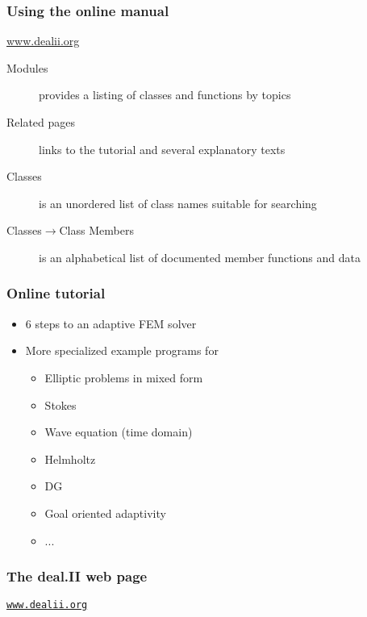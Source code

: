 \begin{frame}
  \frametitle{Using the online manual}
  \begin{center}
    \url{www.dealii.org}
  \end{center}
  \begin{description}
  \item[Modules] provides a listing of
    classes and functions by topics
  \item[Related pages] links to the tutorial and several explanatory
    texts
  \item[Classes] is an unordered list of class names suitable for
    searching
  \item[Classes$\rightarrow$Class Members] is an alphabetical list of
    documented member functions and data
  \end{description}
\end{frame}

\begin{frame}
  \frametitle{Online tutorial}
  \begin{itemize}
  \item 6 steps to an adaptive FEM solver
  \item More specialized example programs for
    \begin{itemize}
    \item Elliptic problems in mixed form
    \item Stokes
    \item Wave equation (time domain)
    \item Helmholtz
    \item DG
    \item Goal oriented adaptivity
    \item ...
    \end{itemize}
  \end{itemize}
\end{frame}

\begin{frame}
  \frametitle{The deal.II web page}
  \begin{center}
    \texttt{\Large\href{http://www.dealii.org}{www.dealii.org}}
  \end{center}
\end{frame}


